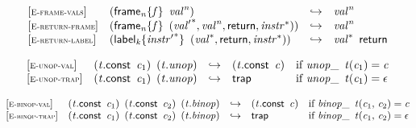$$
\begin{array}{@{}l@{}lcl@{}l@{}}
{[\textsc{\scriptsize E{-}frame{-}vals}]} \quad & ({{\mathsf{frame}}_{{\mathit{n}}}}{\{{\mathit{f}}\}}~\,{{\mathit{val}}^{{\mathit{n}}}}) &\hookrightarrow& {{\mathit{val}}^{{\mathit{n}}}} &  \\
{[\textsc{\scriptsize E{-}return{-}frame}]} \quad & ({{\mathsf{frame}}_{{\mathit{n}}}}{\{{\mathit{f}}\}}~\,({{\mathit{val}'}^\ast}, {{\mathit{val}}^{{\mathit{n}}}}, \mathsf{return}, {{\mathit{instr}}^\ast})) &\hookrightarrow& {{\mathit{val}}^{{\mathit{n}}}} &  \\
{[\textsc{\scriptsize E{-}return{-}label}]} \quad & ({{\mathsf{label}}_{{\mathit{k}}}}{\{{{\mathit{instr}'}^\ast}\}}~\,({{\mathit{val}}^\ast}, \mathsf{return}, {{\mathit{instr}}^\ast})) &\hookrightarrow& {{\mathit{val}}^\ast}~\,\mathsf{return} &  \\
\end{array}
$$

\vspace{1ex}

$$
\begin{array}{@{}l@{}lcl@{}l@{}}
{[\textsc{\scriptsize E{-}unop{-}val}]} \quad & ({\mathit{t}}.\mathsf{const}~\,{\mathit{c}}_{{1}})~\,({\mathit{t}} . {\mathit{unop}}) &\hookrightarrow& ({\mathit{t}}.\mathsf{const}~\,{\mathit{c}}) &\quad
  \mbox{if}~{{{\mathit{unop}}}{\mathsf{\_}}~\,{\mathit{t}}}{({\mathit{c}}_{{1}})} = {\mathit{c}} \\
{[\textsc{\scriptsize E{-}unop{-}trap}]} \quad & ({\mathit{t}}.\mathsf{const}~\,{\mathit{c}}_{{1}})~\,({\mathit{t}} . {\mathit{unop}}) &\hookrightarrow& \mathsf{trap} &\quad
  \mbox{if}~{{{\mathit{unop}}}{\mathsf{\_}}~\,{\mathit{t}}}{({\mathit{c}}_{{1}})} = \epsilon \\
\end{array}
$$

\vspace{1ex}

$$
\begin{array}{@{}l@{}lcl@{}l@{}}
{[\textsc{\scriptsize E{-}binop{-}val}]} \quad & ({\mathit{t}}.\mathsf{const}~\,{\mathit{c}}_{{1}})~\,({\mathit{t}}.\mathsf{const}~\,{\mathit{c}}_{{2}})~\,({\mathit{t}} . {\mathit{binop}}) &\hookrightarrow& ({\mathit{t}}.\mathsf{const}~\,{\mathit{c}}) &\quad
  \mbox{if}~{{{\mathit{binop}}}{\mathsf{\_}}~\,{\mathit{t}}}{({\mathit{c}}_{{1}},\, {\mathit{c}}_{{2}})} = {\mathit{c}} \\
{[\textsc{\scriptsize E{-}binop{-}trap}]} \quad & ({\mathit{t}}.\mathsf{const}~\,{\mathit{c}}_{{1}})~\,({\mathit{t}}.\mathsf{const}~\,{\mathit{c}}_{{2}})~\,({\mathit{t}} . {\mathit{binop}}) &\hookrightarrow& \mathsf{trap} &\quad
  \mbox{if}~{{{\mathit{binop}}}{\mathsf{\_}}~\,{\mathit{t}}}{({\mathit{c}}_{{1}},\, {\mathit{c}}_{{2}})} = \epsilon \\
\end{array}
$$

